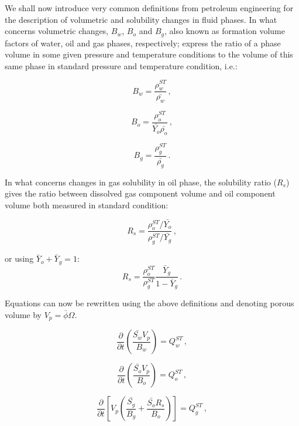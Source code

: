\documentclass[authoryear,preprint,review,12pt]{elsarticle}
\begin{document}
We shall now introduce very common definitions from petroleum engineering for the description of volumetric and solubility changes in fluid phases. In what concerns volumetric changes, $B_w$, $B_o$ and $B_g$, also known as formation volume factors of water, oil and gas phases, respectively; express the ratio of a phase volume in some given pressure and temperature conditions to the volume of this same phase in standard pressure and temperature condition, i.e.:

\begin{equation}
B_w = \frac{\rho_w^{ST}}{\bar{\rho_w}} \, ,
\end{equation}

\begin{equation}
B_o = \frac{\rho_o^{ST}}{\bar{Y_o} \bar{\rho_o}} \, ,
\end{equation}

\begin{equation}
B_g = \frac{\rho_g^{ST}}{\bar{\rho_g}} \, .
\end{equation}

In what concerns changes in gas solubility in oil phase, the solubility ratio ($R_s$) gives the ratio between dissolved gas component volume and oil component volume both measured in standard condition:

\begin{equation}
R_s = \frac{\rho_o^{ST} / \bar{Y_o}}{\rho_g^{ST} / \bar{Y_g}} \, ,
\end{equation}

or using $\bar{Y}_o + \bar{Y}_g = 1$:
\begin{equation}
R_s = \frac{\rho_o^{ST}}{\rho_g^{ST}}\frac{\bar{Y}_g}{1-\bar{Y}_g} \, .
\end{equation}

Equations can now be rewritten using the above definitions and denoting porous volume by $V_p = \bar{\phi}\Omega$.

\begin{equation}\label{eq: Sw4}
\frac{\partial}{\partial t} \left(\frac{\bar{S_w} V_p}{B_w} \right) = Q_w^{ST} \, ,
\end{equation}

\begin{equation}\label{eq: So4}
\frac{\partial}{\partial t} \left(\frac{\bar{S_o} V_p}{B_o} \right) = Q_o^{ST} \, ,
\end{equation}

\begin{equation}\label{eq: Sg4}
\frac{\partial}{\partial t} \left[ V_p \left(\frac{\bar{S_g}}{B_g} + \frac{\bar{S_o} R_s}{B_o} \right) \right] = Q_g^{ST} \, ,
\end{equation}
\end{document}
